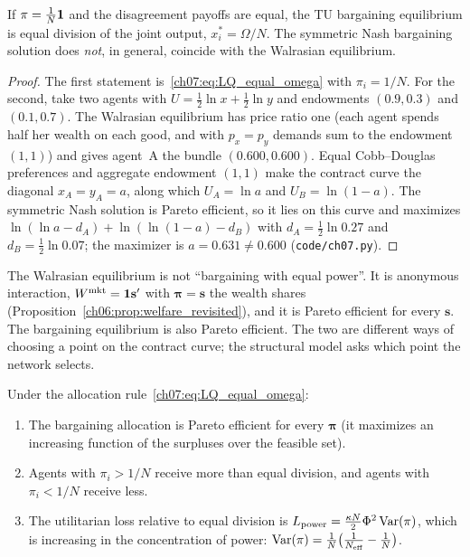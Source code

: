 \documentclass[../structural_economics_book.tex]{subfiles}
\begin{document}
\begin{proposition}\label{ch07:prop:nesting}
If $\pi = \frac{1}{N}\mathbf{1}$ and the disagreement payoffs are equal, the TU bargaining equilibrium is equal division of the joint output, $x_i^* = \Omega/N$. The symmetric Nash bargaining solution does \emph{not}, in general, coincide with the Walrasian equilibrium.
\end{proposition}

\begin{proof}
The first statement is~\eqref{ch07:eq:LQ_equal_omega} with $\pi_i = 1/N$. For the second, take two agents with $U = \frac12\ln x + \frac12\ln y$ and endowments $(0.9, 0.3)$ and $(0.1, 0.7)$. The Walrasian equilibrium has price ratio one (each agent spends half her wealth on each good, and with $p_x = p_y$ demands sum to the endowment $(1, 1)$) and gives agent~A the bundle $(0.600, 0.600)$. Equal Cobb--Douglas preferences and aggregate endowment $(1,1)$ make the contract curve the diagonal $x_A = y_A = a$, along which $U_A = \ln a$ and $U_B = \ln(1-a)$. The symmetric Nash solution is Pareto efficient, so it lies on this curve and maximizes $\ln(\ln a - d_A) + \ln(\ln(1-a) - d_B)$ with $d_A = \frac12\ln 0.27$ and $d_B = \frac12\ln 0.07$; the maximizer is $a = 0.631 \neq 0.600$ (\texttt{code/ch07.py}).
\end{proof}

\begin{intuition}
The Walrasian equilibrium is not ``bargaining with equal power''. It is anonymous interaction, $W^{\text{mkt}} = \mathbf{1}\mathbf{s}'$ with $\boldsymbol{\pi} = \mathbf{s}$ the wealth shares (Proposition~\ref{ch06:prop:welfare_revisited}), and it is Pareto efficient for every $\mathbf{s}$. The bargaining equilibrium is also Pareto efficient. The two are different ways of choosing a point on the contract curve; the structural model asks which point the network selects.
\end{intuition}


\begin{proposition}\label{ch07:prop:direction}
Under the allocation rule~\eqref{ch07:eq:LQ_equal_omega}:
\begin{enumerate}
\item The bargaining allocation is Pareto efficient for every $\boldsymbol{\pi}$ (it maximizes an increasing function of the surpluses over the feasible set).
\item Agents with $\pi_i > 1/N$ receive more than equal division, and agents with $\pi_i < 1/N$ receive less.
\item The utilitarian loss relative to equal division is $L_{\text{power}} = \frac{\kappa N}{2}\Phi^2\operatorname{Var}(\pi)$, which is increasing in the concentration of power: $\operatorname{Var}(\pi) = \frac{1}{N}\bigl(\frac{1}{N_{\text{eff}}} - \frac{1}{N}\bigr)$.
\end{enumerate}
\end{proposition}
\end{document}
